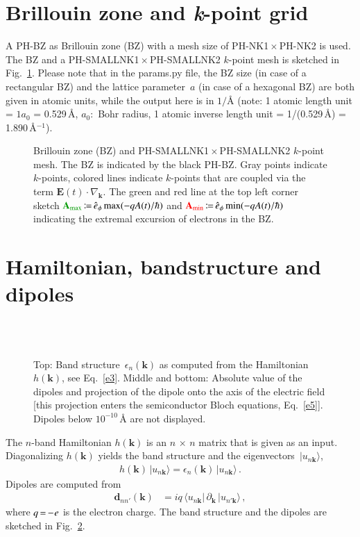 \documentclass[11pt, a4paper]{scrartcl}
\newlength\figureheight
\newlength\figurewidth
\newcommand{\bE}{\mathbf{E}}
\newcommand{\bk}{\mathbf{k}}
\newcommand{\bA}{\mathbf{A}}
\newcommand{\sd}{\hspace{0.05em}}
\newcommand{\eqt}{\,{=}\,}
\newcommand{\coloneqqt}{\,{\coloneqq}\,}
\newcommand{\braunk}{\langle u_{n\bk}|}
\newcommand{\ketunk}{|u_{n\bk}\rangle}
\newcommand{\ketunkprime}{|u_{n'\bk}\rangle}
\newcommand{\timest}{\,{\times}\,}
\begin{document}
\section{Brillouin zone and \textit{k}-point grid}
A PH-BZ as Brillouin zone (BZ) with a mesh size of PH-NK1\,$\times$\,PH-NK2 is used. 
%
The BZ and a PH-SMALLNK1\,$\times$\,PH-SMALLNK2 $k$-point mesh is sketched in Fig.~\ref{fig:kp}.
%
Please note that in the params.py file, the BZ size (in case of a rectangular BZ) and the lattice parameter~$a$ (in case of a hexagonal BZ) are both given in atomic units, while the output here is in $1/${\AA} (note: 1 atomic length unit = $1 a_0$ = 0.529\,\AA, $a_0$:~Bohr radius, 1 atomic inverse length unit = 1/(0.529\,\AA) = 1.890\,\AA$^{-1}$). 
%
\begin{figure}
\centering
\setlength{} 
\setlength{}

\caption{Brillouin zone (BZ) and PH-SMALLNK1\,$\times$\,PH-SMALLNK2 $k$-point mesh.
%
The BZ is indicated by the black PH-BZ.
%
Gray points indicate $k$-points, colored lines indicate $k$-points that are coupled via  the term $\bE(t)\cdot \nabla_\bk$.
%
The green and red line at the top left corner sketch ${\color{darkgreen}\bA_\text{max}}\coloneqqt\hat{e}_\phi\max (-qA(t)/\hbar)$ and ${\color{red}\bA_\text{min}}\coloneqqt\hat{e}_\phi\min (-qA(t)/\hbar)$ indicating the extremal excursion of  electrons in the BZ.  
}
    \label{fig:kp}
\end{figure}


\section{Hamiltonian, bandstructure and dipoles}
\begin{figure}
\centering
\setlength\figureheight{6.5cm} 
\setlength\figurewidth{\textwidth}

\\[2em]

\\[2em]

\caption{Top: Band structure~$\epsilon_n(\bk)$ as computed from the Hamiltonian~$h(\bk)$, see Eq.~\eqref{e3}. 
%
Middle and bottom: Absolute value of the dipoles and projection of the dipole onto the axis of the electric field [this projection enters the semiconductor Bloch equations, Eq.~\eqref{e5}].
%
Dipoles below $10^{-10}$\,{\AA} are not displayed.
}
    \label{fig:bandstructuredipole}
\end{figure}

The $n$-band Hamiltonian $h(\bk)$ is an $n\timest n$ matrix that is given as an input. 
%
Diagonalizing $h(\bk)$ yields the band structure and the eigenvectors~$\ketunk$,
\begin{align}
    h(\bk)\,\ketunk = \epsilon_n(\bk)\,\ketunk\,.
    \label{e3}
\end{align}
Dipoles are computed from
\begin{align}
\mathbf{d}_{nn'}(\bk) &=  iq\, \braunk \,\partial_{\bk}\,\ketunkprime\,,
\end{align}
where $q\eqt {-}\sd{e}$ is the electron charge.
%
The band structure and the dipoles are sketched in Fig.~\ref{fig:bandstructuredipole}. 
\end{document}
